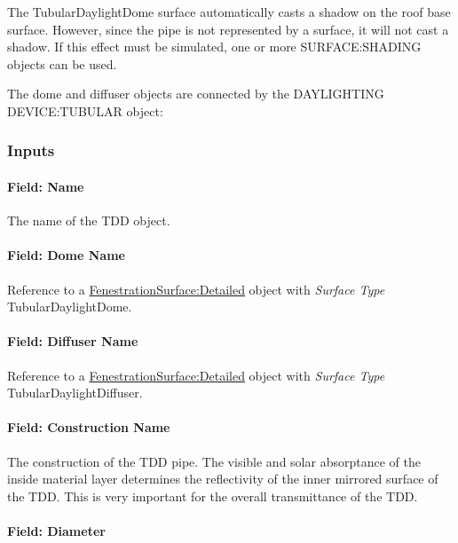 The TubularDaylightDome surface automatically casts a shadow on the roof base surface. However, since the pipe is not represented by a surface, it will not cast a shadow. If this effect must be simulated, one or more SURFACE:SHADING objects can be used.

The dome and diffuser objects are connected by the DAYLIGHTING DEVICE:TUBULAR object:

\subsubsection{Inputs}\label{inputs-6-005}

\paragraph{Field: Name}\label{field-name-3-007}

The name of the TDD object.

\paragraph{Field: Dome Name}\label{field-dome-name}

Reference to a \hyperref[fenestrationsurfacedetailed]{FenestrationSurface:Detailed} object with \emph{Surface Type} TubularDaylightDome.

\paragraph{Field: Diffuser Name}\label{field-diffuser-name}

Reference to a \hyperref[fenestrationsurfacedetailed]{FenestrationSurface:Detailed} object with \emph{Surface Type} TubularDaylightDiffuser.

\paragraph{Field: Construction Name}\label{field-construction-name-001}

The construction of the TDD pipe. The visible and solar absorptance of the inside material layer determines the reflectivity of the inner mirrored surface of the TDD. This is very important for the overall transmittance of the TDD.

\paragraph{Field: Diameter}\label{field-diameter}

